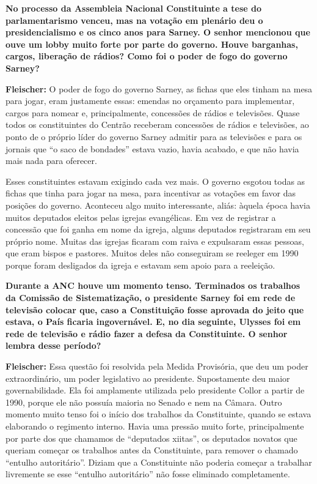 \textbf{No processo da Assembleia Nacional Constituinte a tese do
parlamentarismo venceu, mas na votação em plenário deu o
presidencialismo e os cinco anos para Sarney. O senhor mencionou que
ouve um lobby muito forte por parte do governo. Houve barganhas, cargos,
liberação de rádios? Como foi o poder de fogo do governo Sarney?}

\textbf{Fleischer:} O poder de fogo do governo Sarney, as fichas que
eles tinham na mesa para jogar, eram justamente essas: emendas no
orçamento para implementar, cargos para nomear e, principalmente,
concessões de rádios e televisões. Quase todos os constituintes do
Centrão receberam concessões de rádios e televisões, ao ponto de o
próprio líder do governo Sarney admitir para as televisões e para os
jornais que ``o saco de bondades'' estava vazio, havia acabado, e que
não havia mais nada para oferecer.

Esses constituintes estavam exigindo cada vez mais. O governo esgotou
todas as fichas que tinha para jogar na mesa, para incentivar as
votações em favor das posições do governo. Aconteceu algo muito
interessante, aliás: àquela época havia muitos deputados eleitos pelas
igrejas evangélicas. Em vez de registrar a concessão que foi ganha em
nome da igreja, alguns deputados registraram em seu próprio nome. Muitas
das igrejas ficaram com raiva e expulsaram essas pessoas, que eram
bispos e pastores. Muitos deles não conseguiram se reeleger em 1990
porque foram desligados da igreja e estavam sem apoio para a reeleição.

\textbf{Durante a ANC houve um momento tenso. Terminados os trabalhos da
Comissão de Sistematização, o presidente Sarney foi em rede de televisão
colocar que, caso a Constituição fosse aprovada do jeito que estava, o
País ficaria ingovernável. E, no dia seguinte, Ulysses foi em rede de
televisão e rádio fazer a defesa da Constituinte. O senhor lembra desse
período?}

\textbf{Fleischer:} Essa questão foi resolvida pela Medida Provisória,
que deu um poder extraordinário, um poder legislativo ao presidente.
Supostamente deu maior governabilidade. Ela foi amplamente utilizada
pelo presidente Collor a partir de 1990, porque ele não possuía maioria
no Senado e nem na Câmara. Outro momento muito tenso foi o início dos
trabalhos da Constituinte, quando se estava elaborando o regimento
interno. Havia uma pressão muito forte, principalmente por parte dos que
chamamos de ``deputados xiitas'', os deputados novatos que queriam
começar os trabalhos antes da Constituinte, para remover o chamado
``entulho autoritário''. Diziam que a Constituinte não poderia começar a
trabalhar livremente se esse ``entulho autoritário'' não fosse eliminado
completamente.

